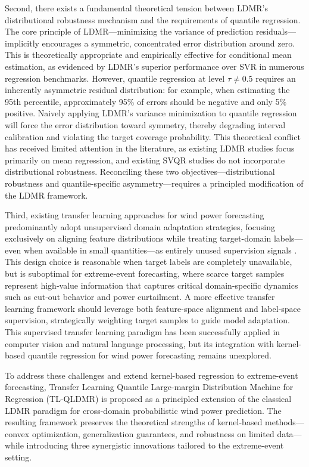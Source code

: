 \documentclass[a4paper]{cas-sc}
\begin{document}
Second, there exists a fundamental theoretical tension between LDMR's distributional robustness mechanism and the requirements of quantile regression. The core principle of LDMR—minimizing the variance of prediction residuals—implicitly encourages a symmetric, concentrated error distribution around zero. This is theoretically appropriate and empirically effective for conditional mean estimation, as evidenced by LDMR's superior performance over SVR in numerous regression benchmarks. However, quantile regression at level $\tau \neq 0.5$ requires an inherently asymmetric residual distribution: for example, when estimating the 95th percentile, approximately 95\% of errors should be negative and only 5\% positive. Naively applying LDMR's variance minimization to quantile regression will force the error distribution toward symmetry, thereby degrading interval calibration and violating the target coverage probability. This theoretical conflict has received limited attention in the literature, as existing LDMR studies focus primarily on mean regression, and existing SVQR studies do not incorporate distributional robustness. Reconciling these two objectives—distributional robustness and quantile-specific asymmetry—requires a principled modification of the LDMR framework.

Third, existing transfer learning approaches for wind power forecasting predominantly adopt unsupervised domain adaptation strategies, focusing exclusively on aligning feature distributions while treating target-domain labels---even when available in small quantities---as entirely unused supervision signals \citep{TAO20123962, GUO2022118237}. This design choice is reasonable when target labels are completely unavailable, but is suboptimal for extreme-event forecasting, where scarce target samples represent high-value information that captures critical domain-specific dynamics such as cut-out behavior and power curtailment. A more effective transfer learning framework should leverage both feature-space alignment and label-space supervision, strategically weighting target samples to guide model adaptation. This supervised transfer learning paradigm has been successfully applied in computer vision and natural language processing, but its integration with kernel-based quantile regression for wind power forecasting remains unexplored.

To address these challenges and extend kernel-based regression to extreme-event forecasting, Transfer Learning Quantile Large-margin Distribution Machine for Regression (TL-QLDMR) is proposed as a principled extension of the classical LDMR paradigm for cross-domain probabilistic wind power prediction. The resulting framework preserves the theoretical strengths of kernel-based methods---convex optimization, generalization guarantees, and robustness on limited data---while introducing three synergistic innovations tailored to the extreme-event setting.
\end{document}
